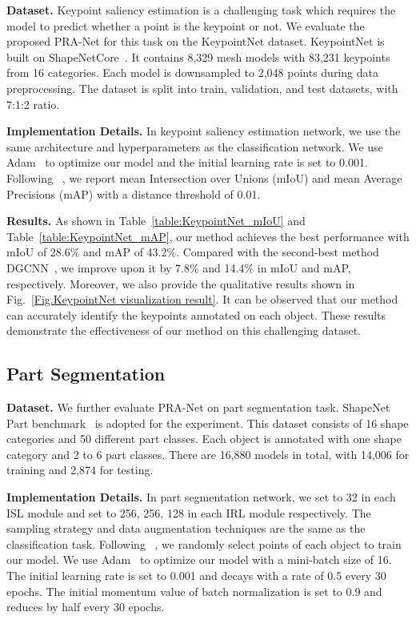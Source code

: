 \documentclass[journal]{IEEEtran}
\begin{document}
\noindent\textbf{Dataset.} Keypoint saliency estimation is a challenging task which requires the model to predict whether a point is the keypoint or not. We evaluate the proposed PRA-Net for this task on the KeypointNet dataset. KeypointNet is built on ShapeNetCore~\cite{yi2016scalable}. It contains 8,329 mesh models with 83,231 keypoints from 16 categories. Each model is downsampled to 2,048 points during data preprocessing. The dataset is split into train, validation, and test datasets, with 7:1:2 ratio.

\noindent\textbf{Implementation Details.} In keypoint saliency estimation network, we use the same architecture and hyperparameters as the classification network. We use Adam~\cite{kingma2014adam} to optimize our model and the initial learning rate is set to 0.001. Following ~\cite{you2020keypointnet}, we report mean Intersection over Unions (mIoU) and mean Average Precisions (mAP) with a distance threshold of 0.01.


\noindent\textbf{Results.} As shown
in Table~\ref{table:KeypointNet_mIoU} and Table~\ref{table:KeypointNet_mAP}, our method achieves the best performance with mIoU of 28.6\% and mAP of 43.2\%. Compared with the second-best method DGCNN~\cite{wang2019dynamic}, we improve upon it by 7.8\% and 14.4\% in mIoU and mAP, respectively. Moreover, we also provide the qualitative results shown in Fig.~\ref{Fig.KeypointNet visualization result}. It can be observed that our method can accurately identify the keypoints annotated on each object. These results demonstrate the effectiveness of our method on this challenging dataset. 




\subsection{Part Segmentation}

\noindent\textbf{Dataset.} We further evaluate PRA-Net on part segmentation task. ShapeNet Part benchmark~\cite{yi2016scalable} is adopted for the experiment. This dataset consists of 16 shape categories and 50 different part classes. Each object is annotated with one shape category and 2 to 6 part classes. There are 16,880 models in total, with 14,006 for training and 2,874 for testing.

\noindent\textbf{Implementation Details.} In part segmentation network, we set  to 32 in each ISL module and set  to 256, 256, 128 in each IRL module respectively. The sampling strategy and data augmentation techniques are the same as the classification task. Following ~\cite{qi2017pointnet++}, we randomly select  points of each object to train our model. We use Adam~\cite{kingma2014adam} to optimize our model with a mini-batch size of 16. The initial learning rate is set to 0.001 and decays with a rate of 0.5 every 30 epochs. The initial momentum value of batch normalization is set to 0.9 and reduces by half every 30 epochs.
\end{document}
